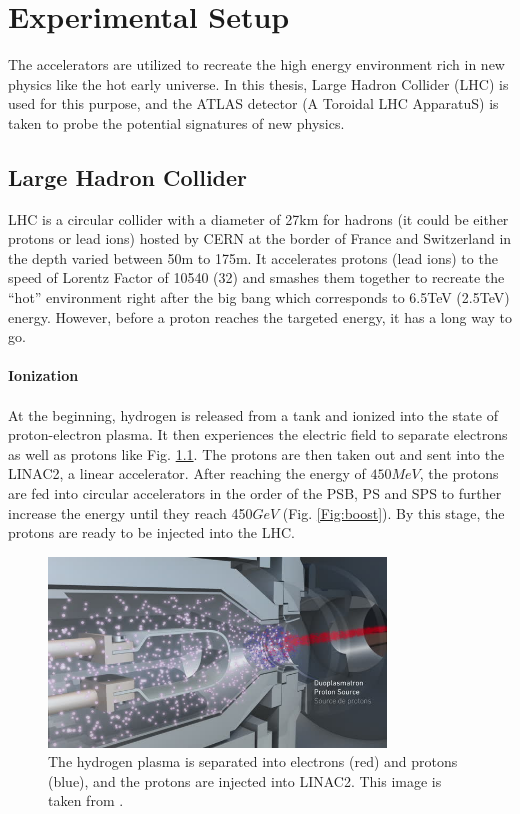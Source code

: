 \chapter{Experimental Setup}
\label{chap:exp}
The accelerators are utilized to recreate the high energy environment rich in new physics like the hot early universe. In this thesis, Large Hadron Collider (LHC) is used for this purpose, and the ATLAS detector (A Toroidal LHC ApparatuS) is taken to probe the potential signatures of new physics. 
\section{Large Hadron Collider\cite{LHC}}
LHC is a circular collider with a diameter of 27km for hadrons (it could be either protons or lead ions) hosted by CERN at the border of France and Switzerland in the depth varied between 50m to 175m. It accelerates protons (lead ions) to the speed of Lorentz Factor of 10540 (32) and smashes them together to recreate the ``hot'' environment right after the big bang which corresponds to 6.5TeV (2.5TeV) energy. However, before a proton reaches the targeted energy, it has a long way to go.
\\
\\{\bf Ionization}
\\
\\At the beginning, hydrogen is released from a tank and ionized into the state of proton-electron plasma. It then experiences the electric field to separate electrons as well as protons like Fig. \ref{Fig:ionization}. The protons are then taken out and sent into the LINAC2, a linear accelerator. After reaching the energy of $450MeV$, the protons are fed into circular accelerators in the order of the PSB, PS and SPS to further increase the energy until they reach 450$GeV$ (Fig. \ref{Fig:boost}). By this stage, the protons are ready to be injected into the LHC.
\begin{figure}[!h]                
	\includegraphics[width=0.8\textwidth]{Chapter2/ionization.png}
	\centering
	\begin{center}
		\caption{The hydrogen plasma is separated into electrons (red) and protons (blue), and the protons are injected into LINAC2. This image is taken from \cite{Ionization}.}
		\label{Fig:ionization}            
	\end{center}
\end{figure}
